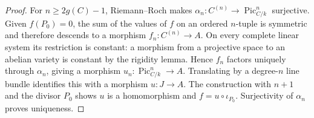 \begin{proof}
  For \(n\ge 2g(C)-1\), Riemann--Roch makes
  \(\alpha_n:C^{(n)}\to\operatorname{Pic}^n_{C/k}\) surjective.  Given
  \(f(P_0)=0\), the sum of the values of \(f\) on an ordered \(n\)-tuple is
  symmetric and therefore descends to a morphism
  \(f_n:C^{(n)}\to A\).  On every complete linear system its restriction is
  constant: a morphism from a projective space to an abelian variety is
  constant by the rigidity lemma.  Hence \(f_n\) factors uniquely through
  \(\alpha_n\), giving a morphism \(u_n:\operatorname{Pic}^n_{C/k}\to A\).
  Translating by a degree-\(n\) line bundle identifies this with a morphism
  \(u:J\to A\).  The construction with \(n+1\) and the divisor
  \(P_0\) shows \(u\) is a homomorphism and \(f=u\circ\iota_{P_0}\).
  Surjectivity of \(\alpha_n\) proves uniqueness.
\end{proof}
